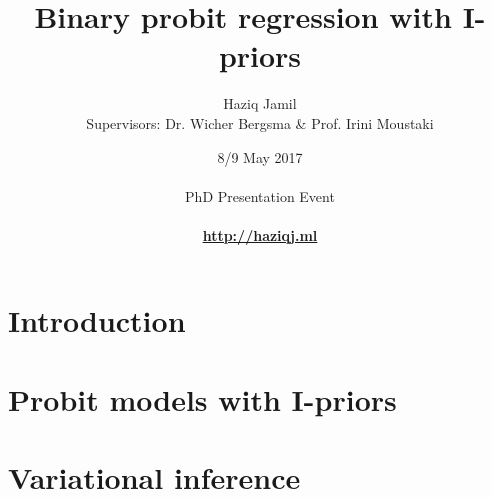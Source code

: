 \documentclass{beamer}
\begin{document}

\title[I-prior probit]{Binary probit regression with I-priors}
\author[Haziq Jamil]{\large{Haziq Jamil}\\ \footnotesize{Supervisors: Dr. Wicher Bergsma \& Prof. Irini Moustaki}}
\date[8/9 May 2017]{8/9 May 2017\\
\hspace{1cm}\\
PhD Presentation Event\\
\hspace{1cm}\\
\href{http://haziqj.ml}{\color{fu-red} \textbf{http://haziqj.ml}}
}

\begin{frame}[plain]
  \addtocounter{framenumber}{-1}
  \titlepage
\end{frame}


\mytoc


\section{Introduction}
%

\section[Probit I-prior]{Probit models with I-priors}
\transition
%

\section[Variational]{Variational inference}
\transition

\end{document}
